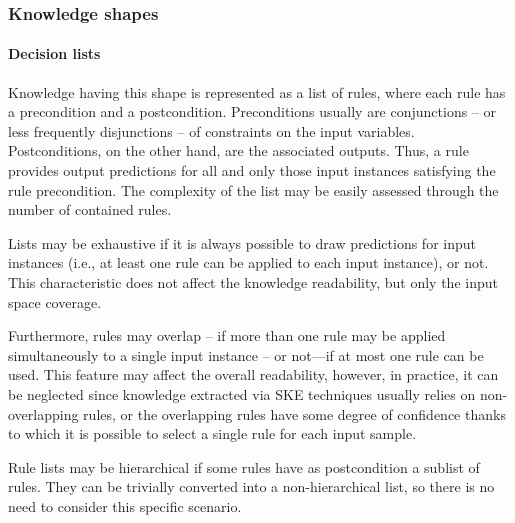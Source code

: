 \documentclass[sigconf]{acmart}
\begin{document}
\subsubsection{Knowledge shapes}

\paragraph{Decision lists}

Knowledge having this shape is represented as a list of rules, where each rule has a precondition and a postcondition.
%
Preconditions usually are conjunctions -- or less frequently disjunctions -- of constraints on the input variables.
%
Postconditions, on the other hand, are the associated outputs.
%
Thus, a rule provides output predictions for all and only those input instances satisfying the rule precondition.
%
The complexity of the list may be easily assessed through the number of contained rules.

Lists may be exhaustive if it is always possible to draw predictions for input instances (i.e., at least one rule can be applied to each input instance), or not.
%
This characteristic does not affect the knowledge readability, but only the input space coverage.

Furthermore, rules may overlap -- if more than one rule may be applied simultaneously to a single input instance -- or not---if at most one rule can be used.
%
This feature may affect the overall readability, however, in practice, it can be neglected since knowledge extracted via SKE techniques usually relies on non-overlapping rules, or the overlapping rules have some degree of confidence thanks to which it is possible to select a single rule for each input sample.

Rule lists may be hierarchical if some rules have as postcondition a sublist of rules.
%
They can be trivially converted into a non-hierarchical list, so there is no need to consider this specific scenario.
\end{document}
